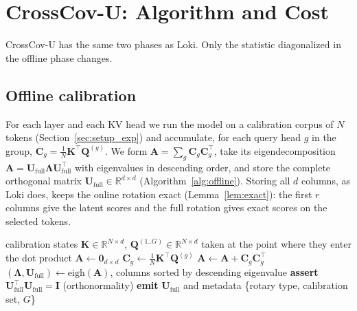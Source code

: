 \documentclass[10pt]{article}
\newcommand{\R}{\mathbb{R}}
\newcommand{\bK}{\mathbf{K}}
\newcommand{\bQ}{\mathbf{Q}}
\newcommand{\bU}{\mathbf{U}}
\newcommand{\bC}{\mathbf{C}}
\newcommand{\bI}{\mathbf{I}}
\newcommand{\method}{CrossCov-U}
\theoremstyle{plain}
\theoremstyle{definition}
\theoremstyle{remark}
\begin{document}

\section{\method{}: Algorithm and Cost}
\label{sec:method}

\method{} has the same two phases as Loki. Only the statistic diagonalized in
the offline phase changes.

\subsection{Offline calibration}

For each layer and each KV head we run the model on a calibration corpus of
$N$ tokens (Section~\ref{sec:setup_exp}) and accumulate, for each query head
$g$ in the group, $\bC_g=\frac1N\bK^\top\bQ^{(g)}$. We form
$\mathbf{A}=\sum_g\bC_g\bC_g^\top$, take its eigendecomposition
$\mathbf{A}=\bU_{\mathrm{full}}\bm{\Lambda}\bU_{\mathrm{full}}^\top$ with
eigenvalues in descending order, and store the complete orthogonal matrix
$\bU_{\mathrm{full}}\in\R^{d\times d}$ (Algorithm~\ref{alg:offline}). Storing
all $d$ columns, as Loki does, keeps the online rotation exact
(Lemma~\ref{lem:exact}): the first $r$ columns give the latent scores and the
full rotation gives exact scores on the selected tokens.

\begin{algorithm}[t]
\caption{\method{} offline calibration (one layer, one KV head)}
\label{alg:offline}
\begin{algorithmic}[1]
\Require calibration states $\bK\in\R^{N\times d}$, $\bQ^{(1..G)}\in\R^{N\times d}$ taken at the point where they enter the dot product
\State $\mathbf{A}\gets\mathbf{0}_{d\times d}$
  \State $\bC_g\gets\frac1N\bK^\top\bQ^{(g)}$ 
  \State $\mathbf{A}\gets\mathbf{A}+\bC_g\bC_g^\top$
\EndFor
\State $(\bm{\Lambda},\bU_{\mathrm{full}})\gets\mathrm{eigh}(\mathbf{A})$, columns sorted by descending eigenvalue
\State \textbf{assert} $\bU_{\mathrm{full}}^\top\bU_{\mathrm{full}}=\bI$ (orthonormality)
\State \textbf{emit} $\bU_{\mathrm{full}}$ and metadata \{rotary type, calibration set, $G$\}
\end{algorithmic}
\end{algorithm}
\end{document}
